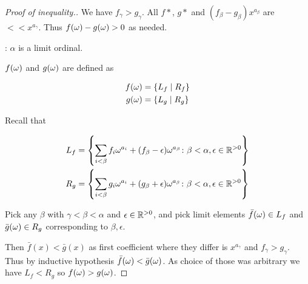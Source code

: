 \begin{proof}[Proof of inequality.]
We have $f_\gamma > g_\gamma$.
All $f*$, $g*$ and $(f_\beta - g_\beta) x^{a_\beta}$ are  $<< x^{a_\gamma}$.
Thus $f(\omega) - g(\omega) > 0$ as needed.

: $\alpha$ is a limit ordinal.

$f(\omega)$ and $g(\omega)$ are defined as 

\begin{align*}
  f(\omega) &= \left\{ L_f \mid R_f \right\} \\
  g(\omega) &= \left\{ L_g \mid R_g \right\}
\end{align*}

Recall that

\begin{align*}
  L_f &= \left\{ \sum_{i < \beta} f_i \omega^{a_i} + (f_\beta - \epsilon) \omega^{a_\beta}
	\colon \beta < \alpha, \epsilon \in \mathbb{R}^{>0} \right\} \\
  R_g &= \left\{ \sum_{i < \beta} g_i \omega^{a_i} + (g_\beta + \epsilon) \omega^{a_\beta}
	\colon \beta < \alpha, \epsilon \in \mathbb{R}^{>0} \right\}
\end{align*}

Pick any $\beta$ with $\gamma < \beta < \alpha$ and $\epsilon \in \mathbb{R}^{>0}$,
and pick limit elements $\bar f(\omega) \in L_f$ and $\bar g(\omega) \in R_g$ corresponding to $\beta, \epsilon$.

Then $\bar f(x) < \bar g(x)$ as first coefficient where they differ is $x^{a_\gamma}$ and $f_\gamma > g_\gamma$.
Thus by inductive hypothesis $\bar f(\omega) < \bar g(\omega)$.
As choice of those was arbitrary we have $L_f < R_g$ so $f(\omega) > g(\omega)$.
\end{proof}

